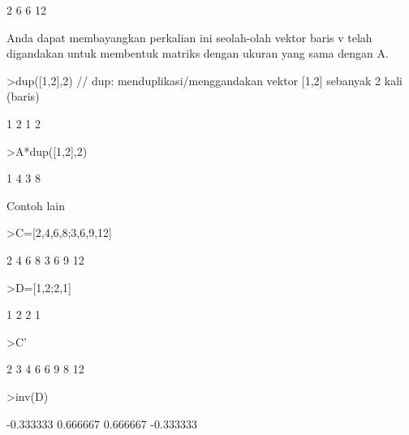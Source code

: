 \documentclass[a4paper,10pt]{article}
\begin{document}
\begin{eulernotebook}
\begin{eulercomment}
\begin{eulercomment}
\begin{eulerprompt}
\end{eulerprompt}
\begin{euleroutput}
              2             6 
              6            12 
\end{euleroutput}
\begin{eulercomment}
Anda dapat membayangkan perkalian ini seolah-olah vektor baris v telah
digandakan untuk membentuk matriks dengan ukuran yang sama dengan A.
\end{eulercomment}
\begin{eulerprompt}
>dup([1,2],2) // dup: menduplikasi/menggandakan vektor [1,2] sebanyak 2 kali (baris)
\end{eulerprompt}
\begin{euleroutput}
              1             2 
              1             2 
\end{euleroutput}
\begin{eulerprompt}
>A*dup([1,2],2) 
\end{eulerprompt}
\begin{euleroutput}
              1             4 
              3             8 
\end{euleroutput}
\begin{eulercomment}
Contoh lain
\end{eulercomment}
\begin{eulerprompt}
>C=[2,4,6,8;3,6,9,12]
\end{eulerprompt}
\begin{euleroutput}
              2             4             6             8 
              3             6             9            12 
\end{euleroutput}
\begin{eulerprompt}
>D=[1,2;2,1]
\end{eulerprompt}
\begin{euleroutput}
              1             2 
              2             1 
\end{euleroutput}
\begin{eulerprompt}
>C'
\end{eulerprompt}
\begin{euleroutput}
              2             3 
              4             6 
              6             9 
              8            12 
\end{euleroutput}
\begin{eulerprompt}
>inv(D)
\end{eulerprompt}
\begin{euleroutput}
      -0.333333      0.666667 
       0.666667     -0.333333 

\end{euleroutput}
\end{eulercomment}
\end{eulercomment}
\end{eulernotebook}
\end{document}

